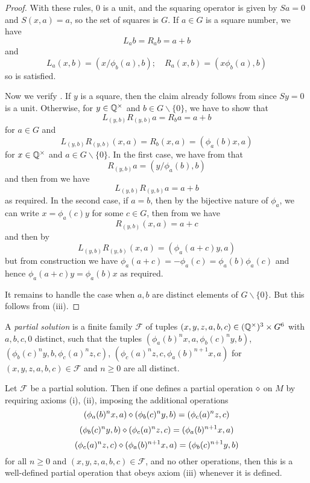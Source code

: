 \begin{proof}
  With these rules, $0$ is a unit, and the squaring operator is given by $Sa = 0$ and $S(x,a) = a$, so the set of squares is $G$.  If $a \in G$ is a square number, we have
  $$ L_a b = R_a b = a+b$$
  and
  $$ L_a (x,b) = (x/\phi_b(a), b); \quad R_a (x,b) = (x \phi_b(a), b)$$
  so  is satisfied.

Now we verify .
If $y$ is a square, then the claim already follows from  since $Sy=0$ is a unit.  Otherwise, for $y \in \mathbb{Q}^\times$ and $b \in G \backslash \{0\}$, we have to show that
$$ L_{(y,b)} R_{(y,b)} a = R_b a = a+b$$
for $a \in G$ and
$$ L_{(y,b)} R_{(y,b)} (x,a) = R_b (x,a) = (\phi_a(b) x, a) $$
for $x \in \mathbb{Q}^\times$ and $a \in G \backslash \{0\}$.  In the first case, we have from  that
$$ R_{(y,b)} a = (y/\phi_a(b), b)$$
and then from  we have
$$L_{(y,b)} R_{(y,b)} a = a+b$$
as required.  In the second case, if $a=b$, then by the bijective nature of $\phi_a$, we can write $x = \phi_a(c) y$ for some $c \in G$, then from  we have
$$ R_{(y,b)} (x,a) = a+c$$
and then by 
$$ L_{(y,b)} R_{(y,b)} (x,a) = (\phi_a(a+c) y, a)$$
but from construction we have $\phi_a(a+c)=-\phi_a(c) = \phi_a(b)\phi_a(c)$ and hence $\phi_a(a+c) y = \phi_a(b) x$ as required.

It remains to handle the case when $a,b$ are distinct elements of $G \backslash \{0\}$.  But this follows from (iii).
\end{proof}

\begin{definition}\label{partial-1323} A \emph{partial solution} is a finite family ${\mathcal F}$ of tuples $(x,y,z,a,b,c) \in (\mathbb{Q}^\times)^3 \times G^6$ with $a,b,c,0$ distinct, such that the tuples
$(\phi_a(b)^n x,a, \phi_b(c)^n y,b)$, $(\phi_b(c)^n y,b,\phi_c(a)^n z,c)$, $(\phi_c(a)^n z,c,\phi_a(b)^{n+1} x, a)$ for $(x,y,z,a,b,c) \in {\mathcal F}$ and $n \geq 0$ are all distinct.
\end{definition}

\begin{lemma}[Soundness]\label{partial-1323-sound}  Let ${\mathcal F}$ be a partial solution.  Then if one defines a partial operation $\diamond$ on $M$ by requiring axioms (i), (ii), imposing the additional operations
$$ (\phi_a(b)^n x,a) \diamond (\phi_b(c)^n y,b) = (\phi_c(a)^n z,c)$$
$$ (\phi_b(c)^n y,b) \diamond (\phi_c(a)^n z,c) = (\phi_a(b)^{n+1} x, a)$$
$$ (\phi_c(a)^n z,c) \diamond (\phi_a(b)^{n+1} x, a) = (\phi_b(c)^{n+1} y,b)$$
for all $n \geq 0$ and $(x,y,z,a,b,c) \in {\mathcal F}$, and no other operations, then this is a well-defined partial operation that obeys axiom (iii) whenever it is defined.
\end{lemma}

